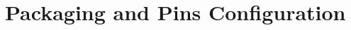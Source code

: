 \documentclass[11pt,pdftex,portrait,letterpaper]{article}
\begin{document}
%	

\newpage



\section{Packaging and Pins Configuration} \label{s:pinsConfig}
\end{document}
